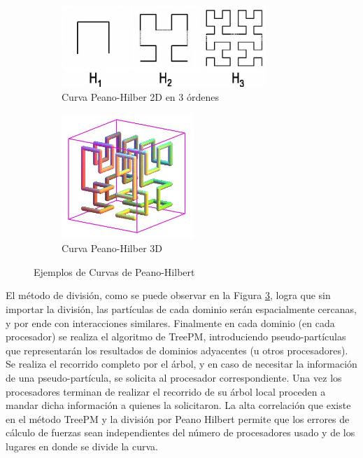 \begin{figure}[H]
	\centering
	\begin{subfigure}[b]{0.48\textwidth}
		\includegraphics[width=0.85\textwidth]{MarcoTeorico/line_2}
		\caption[Curva Peano-Hilber 2D en 3 órdenes]{Curva Peano-Hilber 2D en 3 órdenes\footnotemark[4]}
		\label{fig:ph2d}
	\end{subfigure}
	\hfill
	\begin{subfigure}[b]{0.48\textwidth}
		\includegraphics[width=0.55\textwidth]{MarcoTeorico/hilbert3d01}
		\caption[Curva Peano-Hilber 3D]{Curva Peano-Hilber 3D\footnotemark[5]}
		\label{fig:ph3d}
	\end{subfigure}
	\caption{Ejemplos de Curvas de Peano-Hilbert}
	\label{fig:peanoh}
\end{figure}

El método de división, como se puede observar en la Figura \ref{fig:peanoh}, logra que sin importar la división, las partículas de cada dominio serán espacialmente cercanas, y por ende con interacciones similares. Finalmente en cada dominio (en cada procesador) se realiza el algoritmo de TreePM, introduciendo pseudo-partículas que representarán los resultados de dominios adyacentes (u otros procesadores). Se realiza el recorrido completo por el árbol, y en caso de necesitar la información de una pseudo-partícula, se solicita al procesador correspondiente. Una vez los procesadores terminan de realizar el recorrido de su árbol local proceden a mandar dicha información a quienes la solicitaron. La alta correlación que existe en el método TreePM y la división por Peano Hilbert permite que los errores de cálculo de fuerzas sean independientes del número de procesadores usado y de los lugares en donde se divide la curva.